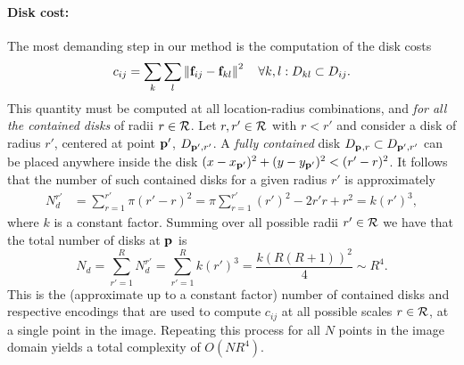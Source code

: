 \documentclass[10pt,twocolumn,letterpaper]{article}
\begin{document}
\paragraph{Disk cost:} The most demanding step in our method is the computation of the disk costs
\begin{equation}
c_{ij} = \sum_k \sum_l \left \lVert \mathbf{f}_{ij} - \mathbf{f}_{kl}  \right \rVert^2 \quad \forall k,l: D_{kl} \subset D_{ij}.
\label{eq:diskcost}
\end{equation}
This quantity must be computed at all location-radius combinations, and \emph{for all the contained disks} of radii $r\in\mathcal{R}$.
Let $r,r'\in\mathcal{R}$ with $r<r'$ and consider a disk of radius $r'$, centered at point $\mathbf{p}_{}'$, $D_{\mathbf{p}_{}',r'}$.
A \emph{fully contained} disk $D_{\mathbf{p}_{},r} \subset D_{\mathbf{p}_{}',r'}$ can be placed anywhere inside the disk
$(x-x_{\mathbf{p}_{}'})^2 + (y-y_{\mathbf{p}_{}'})^2 < (r'-r)^2$.
It follows that the number of such contained disks for a given radius $r'$ is approximately
\begin{align}
N_d^{r'} & = \sum_{r=1}^{r'}  \pi (r'-r)^2  = \pi \sum_{r=1}^{r'} (r')^2 -2r'r + r^2 = k(r')^3,
\label{eq:ndr}
\end{align}
where $k$ is a constant factor.
Summing over all possible radii $r'\in\mathcal{R}$ we have that the total number of disks at $\mathbf{p}_{}$ is
\begin{equation}
N_d = \sum_{r'=1}^R N_d^{r'} = \sum_{r'=1}^R k (r')^3 = \frac{k(R(R+1))^2}{4} \sim R^4.
\label{eq:nd}
\end{equation}
This is the (approximate up to a constant factor) number of contained disks and respective encodings that are used to compute $c_{ij}$ at
all possible scales $r \in \mathcal{R}$, at a single point in the image.
Repeating this process for all $N$ points in the image domain yields a total complexity of $O(NR^4)$.
\end{document}

